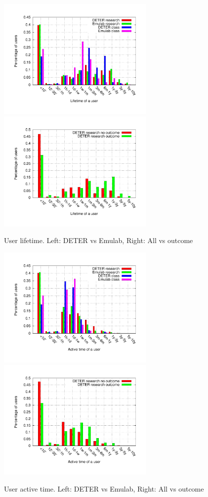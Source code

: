 \documentclass[10pt, twocolumn]{article} %
\begin{document}
\begin{figure}[htbp] \begin{center} \includegraphics[width=3in,
type=pdf,ext=.pdf,read=.pdf]{figs/user.life.gnu}
\includegraphics[width=3in,
type=pdf,ext=.pdf,read=.pdf]{figs/user.life.cmp.gnu} \caption{User
lifetime. Left: DETER vs Emulab, Right: All vs outcome} \label{userlife}
\end{center} \end{figure}


\begin{figure}[htbp] \begin{center} \includegraphics[width=3in,
type=pdf,ext=.pdf,read=.pdf]{figs/user.active.gnu}
\includegraphics[width=3in,
type=pdf,ext=.pdf,read=.pdf]{figs/user.active.cmp.gnu} \caption{User
active time. Left: DETER vs Emulab, Right: All vs outcome}
\label{useractive} \end{center} \end{figure}
\end{document}
